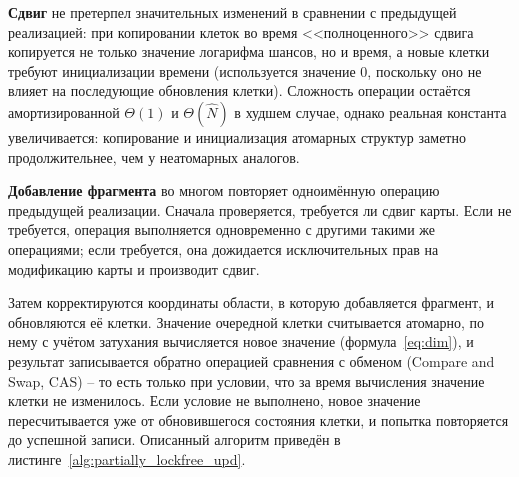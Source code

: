 \textbf{Сдвиг} не претерпел значительных изменений в сравнении с предыдущей реализацией: при копировании клеток во время <<полноценного>> сдвига копируется не только значение логарифма шансов, но и время, а новые клетки требуют инициализации времени (используется значение $0$, поскольку оно не влияет на последующие обновления клетки). Сложность операции остаётся амортизированной $\Theta(1)$ и $\Theta(\widehat{N})$ в худшем случае, однако реальная константа увеличивается: копирование и инициализация атомарных структур заметно продолжительнее, чем у неатомарных аналогов.

\textbf{Добавление фрагмента} во многом повторяет одноимённую операцию предыдущей реализации. Сначала проверяется, требуется ли сдвиг карты. Если не требуется, операция выполняется одновременно с другими такими же операциями; если требуется, она дожидается исключительных прав на модификацию карты и производит сдвиг.

Затем корректируются координаты области, в которую добавляется фрагмент, и обновляются её клетки. Значение очередной клетки считывается атомарно, по нему с учётом затухания вычисляется новое значение (формула~\cref{eq:dim}), и результат записывается обратно операцией сравнения с обменом (Compare and Swap, CAS) -- то есть только при условии, что за время вычисления значение клетки не изменилось. Если условие не выполнено, новое значение пересчитывается уже от обновившегося состояния клетки, и попытка повторяется до успешной записи. Описанный алгоритм приведён в листинге~\ref{alg:partially_lockfree_upd}.


